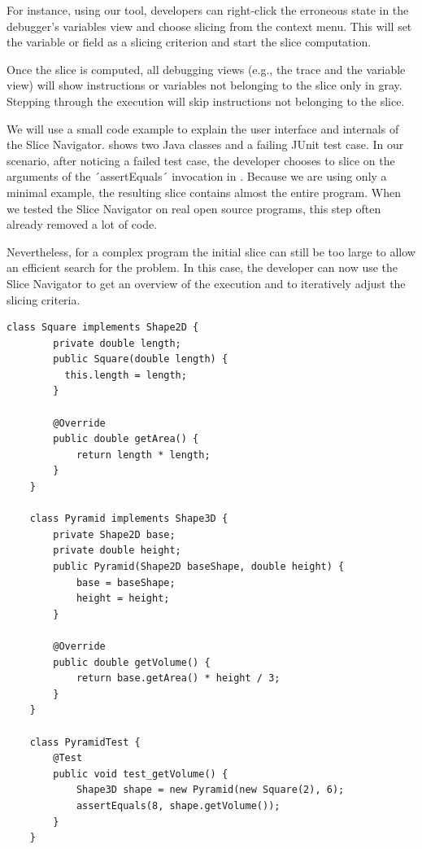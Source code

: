 \documentclass[
			english,
			review,
			]{elsarticle}
\begin{document}
For instance, using our tool, developers can right-click the erroneous state in the debugger's variables view and choose slicing from the context menu.
This will set the variable or field as a slicing criterion and start the slice computation.

Once the slice is computed, all debugging views (e.g., the trace and the variable view) will show instructions or variables not belonging to the slice only in gray.
Stepping through the execution will skip instructions not belonging to the slice.

We will use a small code example to explain the user interface and internals of the Slice Navigator. 
 shows two Java classes and a failing JUnit test case.
In our scenario, after noticing a failed test case, the developer chooses to slice on the arguments of the ´assertEquals´ invocation in .
Because we are using only a minimal example, the resulting slice contains almost the entire program.
When we tested the Slice Navigator on real open source programs, this step often already removed a lot of code.

Nevertheless, for a complex program the initial slice can still be too large to allow an efficient search for the problem.
In this case, the developer can now use the Slice Navigator to get an overview of the execution and to iteratively adjust the slicing criteria.

\begin{lstlisting}[float=t,label=lst:example,caption={Example program with a failing test case}]
	class Square implements Shape2D {
		private double length;
		public Square(double length) { 
		  this.length = length;
		}
		
		@Override
		public double getArea() { 
			return length * length;
		}
	}
	
	class Pyramid implements Shape3D {
		private Shape2D base;
		private double height;
		public Pyramid(Shape2D baseShape, double height) {
			base = baseShape;
			height = height;
		}
		
		@Override
		public double getVolume() { 
			return base.getArea() * height / 3; 
		}
	}
	
	class PyramidTest {
		@Test
		public void test_getVolume() {
			Shape3D shape = new Pyramid(new Square(2), 6);
			assertEquals(8, shape.getVolume());
		}
	}
\end{lstlisting}
\end{document}
